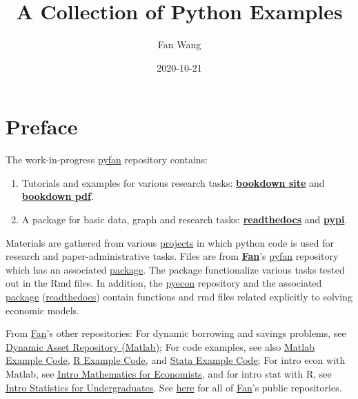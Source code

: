 \documentclass[
]{book}
\title{A Collection of Python Examples}
\author{Fan Wang}
\date{2020-10-21}
\providecommand{\tightlist}{%
  \setlength{\itemsep}{0pt}\setlength{\parskip}{0pt}}
\begin{document}
\maketitle

{
\hypersetup{linkcolor=}
\setcounter{tocdepth}{2}
\tableofcontents
}
\hypertarget{preface}{%
\chapter*{Preface}\label{preface}}

The work-in-progress \href{https://github.com/FanWangEcon/pyfan}{pyfan} repository contains:

\begin{enumerate}
\def\labelenumi{\arabic{enumi}.}
\tightlist
\item
  Tutorials and examples for various research tasks: \href{https://fanwangecon.github.io/pyfan/bookdown}{\textbf{bookdown site}} and \href{https://fanwangecon.github.io/pyfan/bookdown/A-Collection-of-Python-Examples.pdf}{\textbf{bookdown pdf}}.
\item
  A package for basic data, graph and research tasks: \href{https://pyfan.readthedocs.io/en/latest/}{\textbf{readthedocs}} and \href{https://pypi.org/project/pyfan/}{\textbf{pypi}}.
\end{enumerate}

Materials are gathered from various \href{https://fanwangecon.github.io/research}{projects} in which python code is used for research and paper-administrative tasks. Files are from \href{https://fanwangecon.github.io/}{\textbf{Fan}}'s \href{https://github.com/FanWangEcon/pyfan}{pyfan} repository which has an associated \href{https://pypi.org/project/pyfan/}{package}. The package functionalize various tasks tested out in the Rmd files. In addition, the \href{https://github.com/FanWangEcon/pyecon}{pyecon} repository and the associated \href{https://pypi.org/project/pyecon/}{package} (\href{https://pyfan.readthedocs.io/en/latest/autoapi/pyfan/index.html\#module-pyfan}{readthedocs}) contain functions and rmd files related explicitly to solving economic models.

From \href{https://fanwangecon.github.io/}{Fan}'s other repositories: For dynamic borrowing and savings problems, see \href{https://fanwangecon.github.io/CodeDynaAsset/}{Dynamic Asset Repository (Matlab)}; For code examples, see also \href{https://fanwangecon.github.io/M4Econ/}{Matlab Example Code}, \href{https://fanwangecon.github.io/R4Econ/}{R Example Code}, and \href{https://fanwangecon.github.io/Stata4Econ/}{Stata Example Code}; For intro econ with Matlab, see \href{https://fanwangecon.github.io/Math4Econ/}{Intro Mathematics for Economists}, and for intro stat with R, see \href{https://fanwangecon.github.io/Stat4Econ/}{Intro Statistics for Undergraduates}. See \href{https://github.com/FanWangEcon}{here} for all of \href{https://fanwangecon.github.io/}{Fan}'s public repositories.
\end{document}
